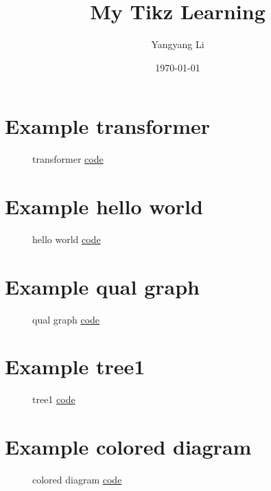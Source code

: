\documentclass{article}
\title{My Tikz Learning}
\author{Yangyang Li}
\date{\today}
\begin{document}
\maketitle
\clearpage
\tableofcontents


\section{Example transformer}

\begin{figure}[H]
	\centering
	
	\caption{transformer \href{https://github.com/cauliyang/learn_tikz/blob/main/transformer.tex}{code} }
	\label{fig:transformer}
\end{figure}

\section{Example hello world}

\begin{figure}[H]
	\centering
	
	\caption{hello world \href{https://github.com/cauliyang/learn_tikz/blob/main/hello_world.tex}{code} }
	\label{fig:hello world}
\end{figure}

\section{Example qual graph}

\begin{figure}[H]
	\centering
	
	\caption{qual graph \href{https://github.com/cauliyang/learn_tikz/blob/main/qual_graph.tex}{code} }
	\label{fig:qual graph}
\end{figure}

\section{Example tree1}

\begin{figure}[H]
	\centering
	
	\caption{tree1 \href{https://github.com/cauliyang/learn_tikz/blob/main/tree1.tex}{code} }
	\label{fig:tree1}
\end{figure}

\section{Example colored diagram}

\begin{figure}[H]
	\centering
	
	\caption{colored diagram \href{https://github.com/cauliyang/learn_tikz/blob/main/colored_diagram.tex}{code} }
	\label{fig:colored diagram}
\end{figure}
\end{document}
